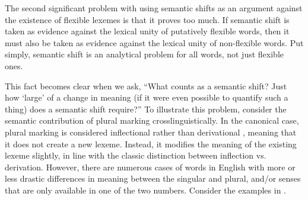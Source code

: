The second significant problem with using semantic shifts as an argument against the existence of flexible lexemes is that it proves too much. If semantic shift is taken as evidence against the lexical unity of putatively flexible words, then it must also be taken as evidence against the lexical unity of non-flexible words. Put simply, semantic shift is an analytical problem for all words, not just flexible ones.

This fact becomes clear when we ask, \enquote{What counts as a semantic shift? Just how \enquote{large} of a change in meaning (if it were even possible to quantify such a thing) does a semantic shift require?} To illustrate this problem, consider the semantic contribution of plural marking crosslinguistically. In the canonical case, plural marking is considered inflectional rather than derivational \parencite[2]{Corbett2000}, meaning that it does not create a new lexeme. Instead, it modifies the meaning of the existing lexeme slightly, in line with the classic distinction between inflection vs. derivation. However, there are numerous cases of words in English with more or less drastic differences in meaning between the singular and plural, and/or senses that are only available in one of the two numbers. Consider the examples in .

